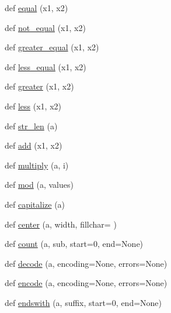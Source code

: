 \begin{DoxyCompactItemize}
\item 
def \hyperlink{namespacenumpy_1_1core_1_1defchararray_a11e82151823b58f711c3238b64d172a1}{equal} (x1, x2)
\item 
def \hyperlink{namespacenumpy_1_1core_1_1defchararray_a57a07662e4686a064563813c2d4d1eca}{not\+\_\+equal} (x1, x2)
\item 
def \hyperlink{namespacenumpy_1_1core_1_1defchararray_a80726c4ec5ca4d879c2561c92857dbc6}{greater\+\_\+equal} (x1, x2)
\item 
def \hyperlink{namespacenumpy_1_1core_1_1defchararray_a405f94ea7695dd678abcc64873cd0ddc}{less\+\_\+equal} (x1, x2)
\item 
def \hyperlink{namespacenumpy_1_1core_1_1defchararray_a2f08b69cc500e2d159b8ed84f357c704}{greater} (x1, x2)
\item 
def \hyperlink{namespacenumpy_1_1core_1_1defchararray_a1987c20db9730545e89c18fa8bf56e05}{less} (x1, x2)
\item 
def \hyperlink{namespacenumpy_1_1core_1_1defchararray_a74673e10d6bebdbe3b62f7fa7fa4027c}{str\+\_\+len} (a)
\item 
def \hyperlink{namespacenumpy_1_1core_1_1defchararray_a04d34947dae1047579629b8f9584c4ce}{add} (x1, x2)
\item 
def \hyperlink{namespacenumpy_1_1core_1_1defchararray_a2435cf83f23e09b4cbff427d13216da7}{multiply} (a, i)
\item 
def \hyperlink{namespacenumpy_1_1core_1_1defchararray_a161e1ba16e5cefbd7fc1d4ceb66b9c2a}{mod} (a, values)
\item 
def \hyperlink{namespacenumpy_1_1core_1_1defchararray_a90aac2c88f442f50844f1635280a3154}{capitalize} (a)
\item 
def \hyperlink{namespacenumpy_1_1core_1_1defchararray_a1eebc98d29a1d099419792332efcabd8}{center} (a, width, fillchar=\textquotesingle{} \textquotesingle{})
\item 
def \hyperlink{namespacenumpy_1_1core_1_1defchararray_ad55baa07b66bc2b0f442f744091c4985}{count} (a, sub, start=0, end=None)
\item 
def \hyperlink{namespacenumpy_1_1core_1_1defchararray_a01d921d26de7a9209d073f3f70eeebeb}{decode} (a, encoding=None, errors=None)
\item 
def \hyperlink{namespacenumpy_1_1core_1_1defchararray_aecca243ca0f2d27e5f08109c62cf68c1}{encode} (a, encoding=None, errors=None)
\item 
def \hyperlink{namespacenumpy_1_1core_1_1defchararray_a071d58de4b1d43aac3665aff0b4bb7f7}{endswith} (a, suffix, start=0, end=None)

\end{DoxyCompactItemize}
